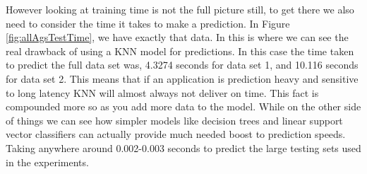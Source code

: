 \documentclass[
	letterpaper, %
]{IEEEtran}
\begin{document}
	However looking at training time is not the full picture still, to get there we also need to consider the time it takes to make a prediction. In Figure \ref{fig:allAgsTestTime}, we have exactly that data. In this is where we can see the real drawback of using a KNN model for predictions. In this case the time taken to predict the full data set was, 4.3274 seconds for data set 1, and 10.116 seconds for data set 2. This means that if an application is prediction heavy and sensitive to long latency KNN will almost always not deliver on time. This fact is compounded more so as you add more data to the model. While on the other side of things we can see how simpler models like decision trees and linear support vector classifiers can actually provide much needed boost to prediction speeds. Taking anywhere around 0.002-0.003 seconds to predict the large testing sets used in the experiments.
\end{document}
